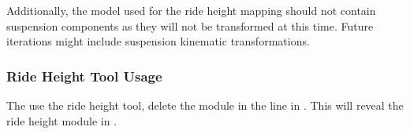 Additionally, the model used for the ride height mapping should not contain suspension components as they will not be transformed at this time. Future iterations might include suspension kinematic transformations.

\subsubsection{Ride Height Tool Usage}
The use the ride height tool, delete the  module in the  line in . This will reveal the ride height module in .
